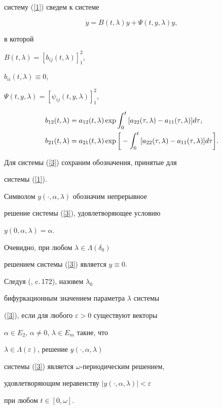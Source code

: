 систему (\ref{1}) сведем к системе


\begin{equation}


\label{3}


\Dot y=B(t,\lambda)y+\Psi (t,y,\lambda)y,


\end{equation}


в которой


$B(t,\lambda)=[b_{ij} (t,\lambda)]_1^2$,


$b_{ii} (t,\lambda) \equiv 0$,


$\Psi (t,y,\lambda)=[\psi_{ij} (t,y,\lambda)]_1^2$,


\begin{align*}


b_{12} (t,\lambda)&=a_{12} (t,\lambda)\exp \ds \int_0^t {[a_{22}


(\tau,\lambda) - a_{11} (\tau,\lambda)]d\tau},\\


b_{21} (t,\lambda)&=a_{21} (t,\lambda)\exp \bigg[-\ds \int_0^t {[a_{22}


(\tau,\lambda) - a_{11} (\tau,\lambda)]d\tau}\bigg].


\end{align*}


Для системы (\ref{3}) сохраним обозначения, принятые для


системы (\ref{1}).


Символом $y(\cdot,\alpha,\lambda)$ обозначим непрерывное


решение системы (\ref{3}), удовлетворяющее условию


$y(0,\alpha,\lambda)=\alpha$.


Очевидно, при любом $\lambda \in \Lambda (\delta_0)$ 


решением системы (\ref{3}) является $y \equiv 0$.





\begin{defnnonum}


Следуя (\cite{Krasn}, c.\,172), назовем $\lambda_0$


бифуркационным значением параметра $\lambda$ системы


(\ref{3}), если для любого $\varepsilon >0$ существуют векторы


$\alpha \in E_2$, $\alpha \ne 0$, $\lambda \in E_m$ такие, что


$\lambda \in \Lambda (\varepsilon)$, решение $y(\cdot, \alpha, \lambda)$


системы (\ref{3}) является $\omega$-периодическим решением,


удовлетворяющим неравенству $|y(\cdot,\alpha,\lambda)| < \varepsilon$


при любом $t \in [0,\omega]$.


\end{defnnonum}





